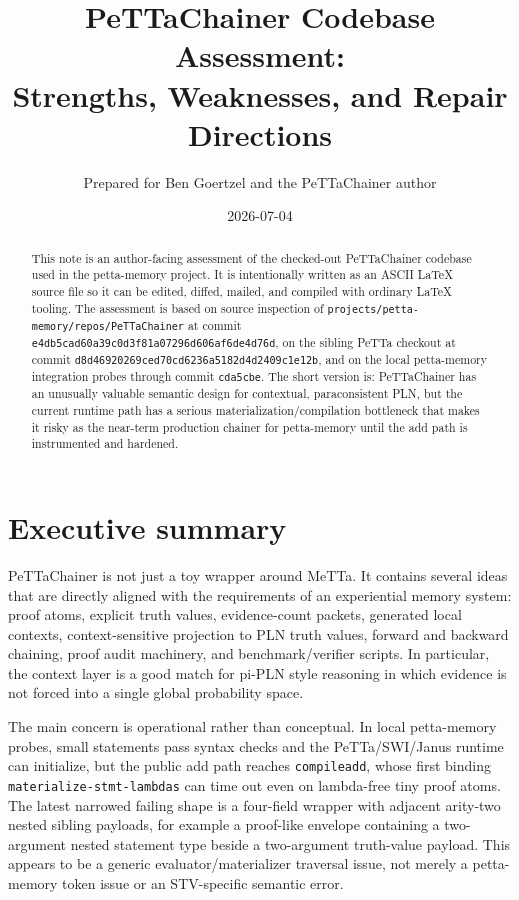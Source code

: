 \documentclass[11pt]{article}
\title{PeTTaChainer Codebase Assessment:\\Strengths, Weaknesses, and Repair Directions}
\author{Prepared for Ben Goertzel and the PeTTaChainer author}
\date{2026-07-04}
\newcommand{\code}[1]{\texttt{#1}}
\newcommand{\fpath}[1]{\texttt{#1}}
\begin{document}
\maketitle

\begin{abstract}
This note is an author-facing assessment of the checked-out PeTTaChainer
codebase used in the petta-memory project.  It is intentionally written as an
ASCII LaTeX source file so it can be edited, diffed, mailed, and compiled with
ordinary LaTeX tooling.  The assessment is based on source inspection of
\fpath{projects/petta-memory/repos/PeTTaChainer} at commit
\code{e4db5cad60a39c0d3f81a07296d606af6de4d76d}, on the sibling PeTTa checkout
at commit \code{d8d46920269ced70cd6236a5182d4d2409c1e12b}, and on the local
petta-memory integration probes through commit \code{cda5cbe}.  The short
version is: PeTTaChainer has an unusually valuable semantic design for
contextual, paraconsistent PLN, but the current runtime path has a serious
materialization/compilation bottleneck that makes it risky as the near-term
production chainer for petta-memory until the add path is instrumented and
hardened.
\end{abstract}

\tableofcontents

\section{Executive summary}

PeTTaChainer is not just a toy wrapper around MeTTa.  It contains several ideas
that are directly aligned with the requirements of an experiential memory
system: proof atoms, explicit truth values, evidence-count packets, generated
local contexts, context-sensitive projection to PLN truth values, forward and
backward chaining, proof audit machinery, and benchmark/verifier scripts.  In
particular, the context layer is a good match for pi-PLN style reasoning in
which evidence is not forced into a single global probability space.

The main concern is operational rather than conceptual.  In local petta-memory
probes, small statements pass syntax checks and the PeTTa/SWI/Janus runtime can
initialize, but the public add path reaches \code{compileadd}, whose first
binding \code{materialize-stmt-lambdas} can time out even on lambda-free tiny
proof atoms.  The latest narrowed failing shape is a four-field wrapper with
adjacent arity-two nested sibling payloads, for example a proof-like envelope
containing a two-argument nested statement type beside a two-argument truth-value
payload.  This appears to be a generic evaluator/materializer traversal issue,
not merely a petta-memory token issue or an STV-specific semantic error.
\end{document}
